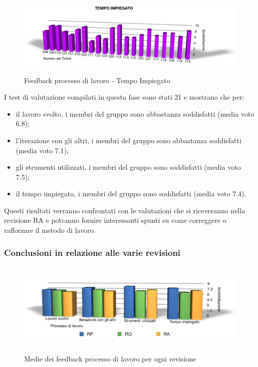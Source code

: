 \begin{figure}[htbp]
  \centering
  \includegraphics[height=4.1cm]{img/PQ/TempoImpiegato.png}
\caption{Feedback processo di lavoro - Tempo Impiegato}
\end{figure}

\newpage
I test di valutazione compilati in questa fase sono stati 21 e mostrano che
per:
\begin{itemize}
  \item il lavoro svolto, i membri del gruppo sono abbastanza
  soddisfatti (media voto 6.8);
  \item l'iterazione con gli altri, i membri del gruppo sono
  abbastanza soddisfatti (media voto 7.1);
  \item gli strumenti utilizzati, i membri del gruppo
  sono soddisfatti (media voto 7.5);
  \item il tempo impiegato, i membri del gruppo
  sono soddisfatti (media voto 7.4).\\
\end{itemize}

Questi risultati verranno confrontati con le valutazioni che si riceveranno
nella revisione RA e potranno fornire interessanti spunti su come correggere o
rafforzare il metodo di lavoro.

\newpage
\subsubsection*{Conclusioni in relazione alle varie revisioni}

\begin{figure}[htbp]
  \centering
  \includegraphics[height=4.5cm]{img/PQ/RiassuntoFeedback.png}
\caption{Medie dei feedback processo di lavoro per ogni revisione}
\end{figure}

